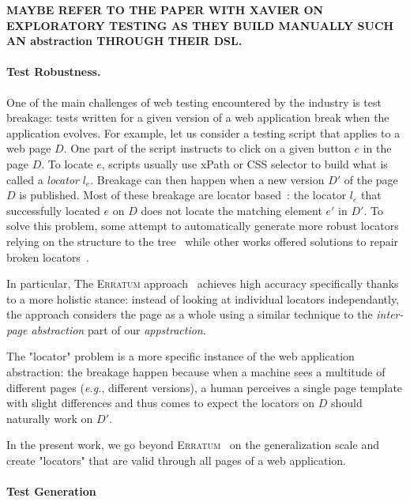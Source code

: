 \textbf{MAYBE REFER TO THE PAPER WITH XAVIER ON EXPLORATORY TESTING AS THEY BUILD MANUALLY SUCH AN abstraction THROUGH THEIR DSL.}

\paragraph{Test Robustness.}
One of the main challenges of web testing encountered by the industry is test breakage: tests written for a given version of a web application break when the application evolves.
For example, let us consider a testing script that applies to a web page $D$.
One part of the script instructs to click on a given button $e$ in the page $D$.
To locate $e$, scripts usually use xPath or CSS selector to build what is called a \emph{locator} $l_e$. 
Breakage can then happen when a new version $D'$ of the page $D$ is published.
Most of these breakage are locator based~\cite{Hammoudi2016WhyBreak}: the locator $l_e$ that successfully located $e$ on $D$ does not locate the matching element $e'$ in $D'$. 
To solve this problem, some attempt to automatically generate more robust locators relying on the structure to the tree~\cite{Leotta2016spanLocators, Leotta2021Sidereal:Testing, Yandrapally2014RobustClues, Bajaj2016SynthesizingLocators} while other works offered solutions to repair broken locators~\cite{Brisset2022Erratum:Scripts, Choudhary2011WATER:Repair, Kirinuki2019COLOR:Application}.

In particular, The \textsc{Erratum} approach~\cite{Brisset2022Erratum:Scripts} achieves high accuracy specifically thanks to a more holistic stance: instead of looking at individual locators independantly, the approach considers the page as a whole using a similar technique to the \emph{inter-page abstraction} part of our \emph{appstraction}.

The "locator" problem is a more specific instance of the web application abstraction: the breakage happen because when a machine sees a multitude of different pages (\emph{e.g.}, different versions), a human perceives a single page template with slight differences and thus comes to expect the locators on $D$ should naturally work on $D'$. 

In the present work, we go beyond \textsc{Erratum}~\cite{Brisset2022Erratum:Scripts} on the generalization scale and create "locators" that are valid through all pages of a web application.

\paragraph{Test Generation}

